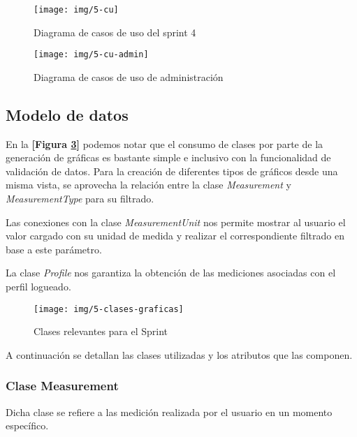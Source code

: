 \begin{figure}[h!]
	\centering
	\texttt{[image: img/5-cu]}
	\caption{Diagrama de casos de uso del sprint 4}
	\label{5-cu}
\end{figure}

\begin{figure}[h!]
	\centering
	\texttt{[image: img/5-cu-admin]}
	\caption{Diagrama de casos de uso de administración}
	\label{5-cu-admin}
\end{figure}


\subsection{Modelo de datos} 

En la \textbf{[Figura \ref{5-clases-graficas}]} podemos notar que el consumo de clases por parte de la generación de gráficas es bastante simple e inclusivo con la funcionalidad de validación de datos. Para la creación de diferentes tipos de gráficos desde una misma vista, se aprovecha la relación entre la clase \textit{Measurement} y \textit{MeasurementType} para su filtrado.

Las conexiones con la clase \textit{MeasurementUnit} nos permite mostrar al usuario el valor cargado con su unidad de medida y realizar el correspondiente filtrado en base a este parámetro.

La clase \textit{Profile} nos garantiza la obtención de las mediciones asociadas con el perfil logueado.

\begin{figure}[h!]
	\centering
	\texttt{[image: img/5-clases-graficas]}
	\caption{Clases relevantes para el Sprint}
	\label{5-clases-graficas}
\end{figure}

A continuación se detallan las clases utilizadas y los atributos que las componen.

\subsubsection{Clase Measurement} 
Dicha clase se refiere a las medición realizada por el usuario en un momento específico. 

